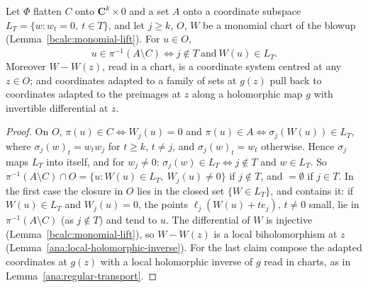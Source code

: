 \begin{lemma}
\label{bcalc:snc-chart}
\leanok
Let \(\Phi\) flatten \(C\) onto \(\mathbf C^{k}\times0\) and a set \(A\) onto a coordinate subspace \(L_T=\{w:w_t=0,\ t\in T\}\), and let \(j\ge k\),
\(O\), \(W\) be a monomial chart of the blowup (Lemma~\ref{bcalc:monomial-lift}). For \(u\in O\),
\[
 u\in\overline{\pi^{-1}(A\setminus C)}\iff j\notin T\ \text{and}\ W(u)\in L_T.
\]
Moreover \(W-W(z)\), read in a chart, is a coordinate system centred at any \(z\in O\); and coordinates adapted to a family of sets
at \(g(z)\) pull back to coordinates adapted to the preimages at \(z\) along a holomorphic map \(g\) with invertible differential at \(z\).
\end{lemma}
\begin{proof}
\leanok
On \(O\), \(\pi(u)\in C\iff W_j(u)=0\) and \(\pi(u)\in A\iff\sigma_j(W(u))\in L_T\), where \(\sigma_j(w)_t=w_tw_j\) for \(t\ge k\), \(t\ne j\), and
\(\sigma_j(w)_t=w_t\) otherwise. Hence \(\sigma_j\) maps \(L_T\) into itself, and for \(w_j\ne0\): \(\sigma_j(w)\in L_T\iff j\notin T\) and \(w\in L_T\).
So \(\pi^{-1}(A\setminus C)\cap O=\{u:W(u)\in L_T,\ W_j(u)\ne0\}\) if \(j\notin T\), and \(=\emptyset\) if \(j\in T\). In the first case the closure in
\(O\) lies in the closed set \(\{W\in L_T\}\), and contains it: if \(W(u)\in L_T\) and \(W_j(u)=0\), the points \(\ell_j(W(u)+te_j)\), \(t\ne0\) small, lie in
\(\pi^{-1}(A\setminus C)\) (as \(j\notin T\)) and tend to \(u\). The differential of \(W\) is injective (Lemma~\ref{bcalc:monomial-lift}), so
\(W-W(z)\) is a local biholomorphism at \(z\) (Lemma~\ref{ana:local-holomorphic-inverse}). For the last claim compose the adapted coordinates
at \(g(z)\) with a local holomorphic inverse of \(g\) read in charts, as in Lemma~\ref{ana:regular-transport}.
\end{proof}


